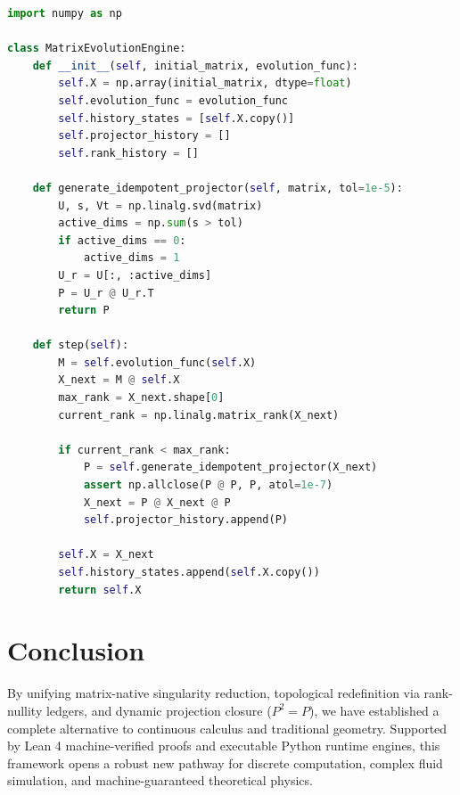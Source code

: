 \documentclass[11pt,a4paper]{article}
\begin{document}
\begin{lstlisting}[language=Python, caption={Python MNTP Simulation Engine with SVD Projection}]
import numpy as np

class MatrixEvolutionEngine:
    def __init__(self, initial_matrix, evolution_func):
        self.X = np.array(initial_matrix, dtype=float)
        self.evolution_func = evolution_func
        self.history_states = [self.X.copy()]
        self.projector_history = []
        self.rank_history = []

    def generate_idempotent_projector(self, matrix, tol=1e-5):
        U, s, Vt = np.linalg.svd(matrix)
        active_dims = np.sum(s > tol)
        if active_dims == 0:
            active_dims = 1
        U_r = U[:, :active_dims]
        P = U_r @ U_r.T
        return P

    def step(self):
        M = self.evolution_func(self.X)
        X_next = M @ self.X
        max_rank = X_next.shape[0]
        current_rank = np.linalg.matrix_rank(X_next)
        
        if current_rank < max_rank:
            P = self.generate_idempotent_projector(X_next)
            assert np.allclose(P @ P, P, atol=1e-7)
            X_next = P @ X_next @ P
            self.projector_history.append(P)

        self.X = X_next
        self.history_states.append(self.X.copy())
        return self.X
\end{lstlisting}

\section{Conclusion}
By unifying matrix-native singularity reduction, topological redefinition via rank-nullity ledgers, and dynamic projection closure ($P^2 = P$), we have established a complete alternative to continuous calculus and traditional geometry. Supported by Lean 4 machine-verified proofs and executable Python runtime engines, this framework opens a robust new pathway for discrete computation, complex fluid simulation, and machine-guaranteed theoretical physics.
\end{document}
